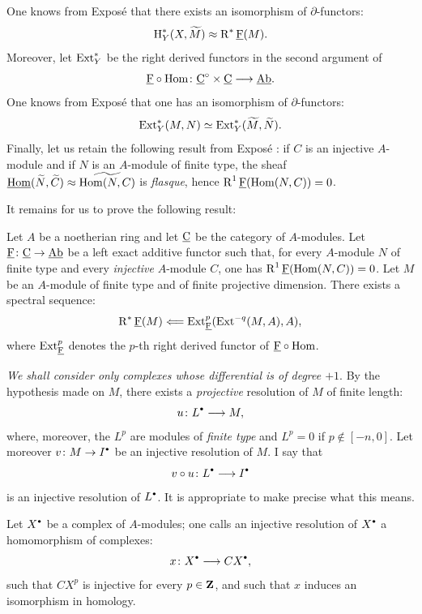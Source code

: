 One knows from Expos\'e  that there exists an isomorphism of $\partial$-functors:
\[
\operatorname{H}^\ast_Y(X, \widetilde{M})\approx \operatorname{R}^\ast {\underline{\mathrm{F}}}(M).
\]
Moreover, let $\operatorname{Ext}^\ast_Y$ be the right derived functors in the second argument of
\[{\cF}\circ \Hom\colon \ccat^\circ \times \ccat \to \Ab.
\]
One knows from Expos\'e  that one has an isomorphism of $\partial$-functors:
\[
\operatorname{Ext}^\ast_Y(M, N)\simeq \operatorname{Ext}^\ast_Y(\widetilde{M}, \widetilde{N}).
\]
Finally, let us retain the following result from Expos\'e : if $C$ is an injective $A$-module and if $N$ is an $A$-module of finite type, the sheaf $\operatorname{\underline{Hom}}(\widetilde{N}, \widetilde{C})\approx\widetilde{\operatorname{Hom}(N, C)}$ is \emph{flasque}, hence $\operatorname{R}^1{\underline{\mathrm{F}}}(\operatorname{Hom}(N, C))=0$.

It remains for us to prove the following result:

\begin{lemma} \label{VIII.1.2} Let $A$ be a noetherian ring and let $\underline{\mathrm{C}}$ be the category of $A$-modules. Let ${\cF}\colon \ccat\to\Ab$ be a left exact additive functor such that, for every $A$-module $N$ of finite type and every \emph{injective} $A$-module $C$, one has $\operatorname{R}^1{\underline{\mathrm{F}}}(\operatorname{Hom}(N, C))=0$. Let $M$ be an $A$-module of finite type and of finite projective dimension. There exists a spectral sequence:
\[
\operatorname{R}^\ast {\underline{\mathrm{F}}}(M)\Longleftarrow \operatorname{Ext}^p_{{\underline{\mathrm{F}}}}(\operatorname{Ext}^{-q}(M, A), A), \]
where $\operatorname{Ext}^p_{{\underline{\mathrm{F}}}}$ denotes the $p$-th right derived functor of ${\underline{\mathrm{F}}}\circ \operatorname{Hom}$.
\end{lemma}

\emph{We shall consider only complexes whose differential is of degree $+1$}. By the hypothesis made on $M$, there exists a \emph{projective} resolution of $M$ of finite length:
\[u\colon L^\boule \to M, \]
where, moreover, the $L^p$ are modules of \emph{finite type} and $L^p=0$ if $p\not\in[-n, 0]$. Let moreover $v\colon M\to I^\boule$ be an injective resolution of $M$. I say that
\begin{equation} \label{eq:VIII.1.1} v\circ u\colon L^\boule\to I^\boule
\end{equation}
is an injective resolution of $L^\boule$. It is appropriate to make precise what this means.

\begin{definition} \label{VIII.1.3} Let $X^\boule$ be a complex of $A$-modules; one calls an injective resolution of $X^\boule$ a homomorphism of complexes:
\[x\colon X^\boule\to CX^\boule, \]
such that $CX^p$ is injective for every $p\in \mathbf{Z}$, and such that $x$ induces an isomorphism in homology.
\end{definition}

